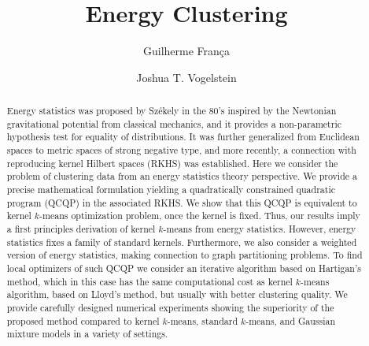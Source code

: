 \documentclass[aps,preprint,nofootinbib,floatfix]{revtex4-1}
\begin{document}
\title{Energy Clustering}

\author{Guilherme Fran\c ca}
\author{Joshua T. Vogelstein}


\begin{abstract}
Energy statistics was proposed by Sz\' ekely in the 80's inspired by the 
Newtonian gravitational potential from classical mechanics, and it provides 
a non-parametric hypothesis test for equality of distributions. 
It was further generalized from Euclidean spaces to metric spaces of 
strong negative type, and more recently, a connection with reproducing 
kernel Hilbert spaces (RKHS) was established. 
Here we consider the problem of clustering data from an 
energy statistics theory perspective.
We provide a precise mathematical formulation 
yielding a quadratically constrained 
quadratic program (QCQP) in the associated RKHS. We show that this QCQP
is equivalent to kernel $k$-means optimization problem, once the kernel
is fixed.
Thus, our results imply a first principles derivation of kernel $k$-means 
from energy statistics.
However, energy statistics fixes a family of standard kernels.
Furthermore, we also consider a weighted version of energy statistics, 
making connection to graph partitioning problems.
To find local optimizers of such QCQP we consider an iterative algorithm based 
on Hartigan's method, which in this case has the same computational cost 
as kernel $k$-means algorithm, based on Lloyd's method, but usually 
with better clustering quality. 
We provide carefully designed numerical experiments showing the superiority 
of the proposed method compared to kernel $k$-means, standard $k$-means, 
and Gaussian mixture models in a variety of settings.
\end{abstract}


\maketitle

\end{document}
